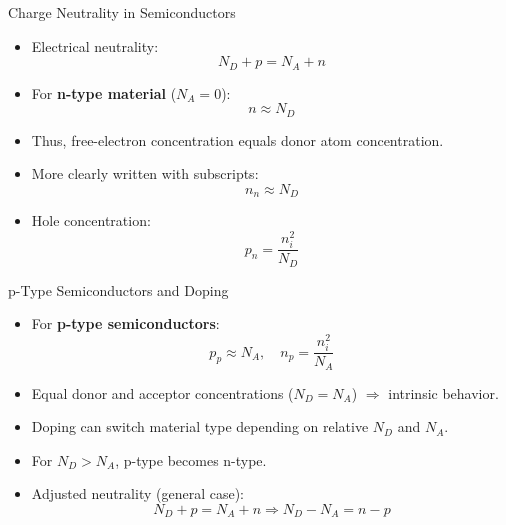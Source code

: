 \begin{frame}{Charge Neutrality in Semiconductors}
    \begin{itemize}
        \item Electrical neutrality:
        \begin{equation}
        N_D + p = N_A + n 
        \end{equation}
        \item For \textbf{n-type material} ($N_A = 0$):
        \begin{equation}
        n \approx N_D 
        \end{equation}
        \item Thus, free-electron concentration equals donor atom concentration.
        \item More clearly written with subscripts:
        \begin{equation} \label{eq:charge_neutrality_n}
        n_n \approx N_D 
        \end{equation}
        \item Hole concentration:
        \begin{equation} \label{eq:charge_neutrality_p}
        p_n = \frac{n_i^2}{N_D} 
        \end{equation}
    \end{itemize}
\end{frame}
\begin{frame}{p-Type Semiconductors and Doping}
    \begin{itemize}
        \item For \textbf{p-type semiconductors}:
        \begin{equation}
        p_p \approx N_A, \quad n_p = \frac{n_i^2}{N_A}
        \end{equation}
        \item Equal donor and acceptor concentrations ($N_D = N_A$) $\Rightarrow$ intrinsic behavior.
        \item Doping can switch material type depending on relative $N_D$ and $N_A$.
        \item For $N_D > N_A$, p-type becomes n-type.
        \item Adjusted neutrality (general case):
        \begin{equation}
        N_D + p = N_A + n \Rightarrow N_D - N_A = n - p
        \end{equation}
    \end{itemize}
\end{frame}
